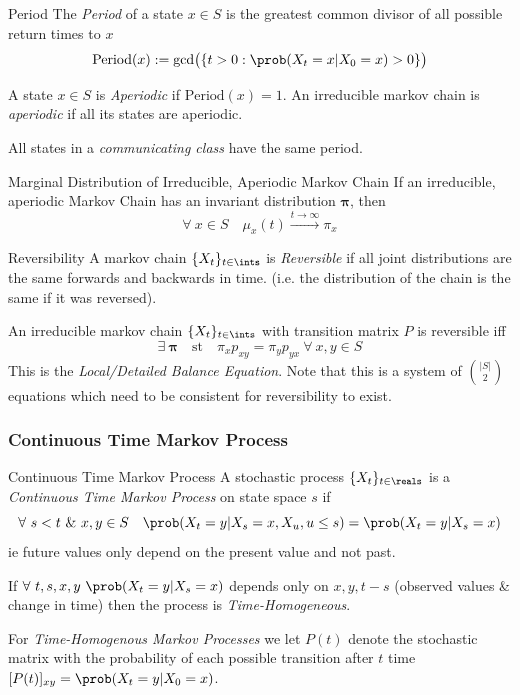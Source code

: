 \documentclass[11pt,a4paper]{article}
\begin{document}
\begin{definition}{Period}
  The \textit{Period} of a state $x\in S$ is the greatest common divisor of all possible return times to $x$
  \[ \text{Period}(x):=\text{gcd}\big(\{t>0:\prob(X_t=x|X_0=x)>0\}\big) \]
  \par A state $x\in S$ is \textit{Aperiodic} if $\text{Period}(x)=1$. An irreducible markov chain is \textit{aperiodic} if all its states are aperiodic.
  \par All states in a \textit{communicating class} have the same period.
\end{definition}

\begin{proposition}{Marginal Distribution of Irreducible, Aperiodic Markov Chain}
  If an irreducible, aperiodic Markov Chain has an invariant distribution $\pmb\pi$, then
  \[ \forall\ x\in S\quad\mu_x(t)\overset{t\to\infty}{\longrightarrow}\pi_x \]
\end{proposition}

\begin{definition}{Reversibility}
  A markov chain $\{X_t\}_{t\in\ints}$ is \textit{Reversible} if all joint distributions are the same forwards and backwards in time. (i.e. the distribution of the chain is the same if it was reversed).
  \par An irreducible markov chain $\{X_t\}_{t\in\ints}$ with transition matrix $P$ is reversible iff
  \[\exists\ \pmb\pi\quad\text{st}\quad\pi_xp_{xy}=\pi_yp_{yx}\ \forall\ x,y\in S\]
  This is the \textit{Local/Detailed Balance Equation}. Note that this is a system of ${|S|\choose2}$ equations which need to be consistent for reversibility to exist.
\end{definition}

\subsubsection{Continuous Time Markov Process}

\begin{definition}{Continuous Time Markov Process}
  A stochastic process $\{X_t\}_{t\in\reals}$ is a \textit{Continuous Time Markov Process} on state space $s$ if
  \[ \forall\ s<t\ \&\ x,y\in S\quad\prob(X_t=y|X_s=x,X_u,u\leq s)=\prob(X_t=y|X_s=x) \]
  ie future values only depend on the present value and not past.
  \par If $\forall\ t,s,x,y\ \prob(X_t=y|X_s=x)$ depends only on $x,y,t-s$ (observed values \& change in time) then the process is \textit{Time-Homogeneous}.
  \par For \textit{Time-Homogenous Markov Processes} we let $P(t)$ denote the stochastic matrix with the probability of each possible transition after $t$ time $[P(t)]_{xy}=\prob(X_t=y|X_0=x)$.
\end{definition}
\end{document}

